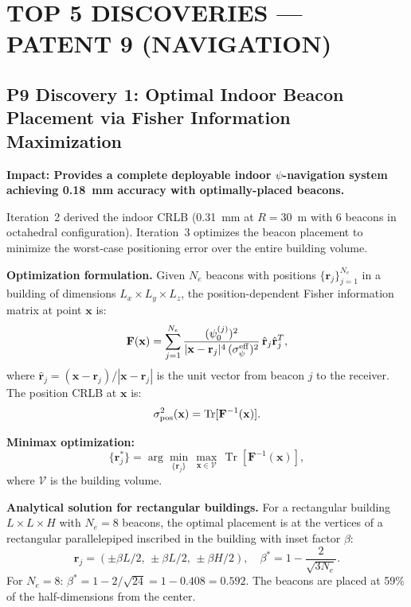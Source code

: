 \documentclass[aps,prd,twocolumn,superscriptaddress,nofootinbib]{revtex4-2}
\newcommand{\FIM}{\mathbf{F}}
\newcommand{\xvec}{\mathbf{x}}
\newcommand{\rvec}{\mathbf{r}}
\DeclareMathOperator{\Tr}{Tr}
\begin{document}
\section{TOP 5 DISCOVERIES --- PATENT 9 (NAVIGATION)}
\label{sec:top5-p9}

\subsection{P9 Discovery 1: Optimal Indoor Beacon Placement via
Fisher Information Maximization}

\textbf{Impact: Provides a complete deployable indoor $\psi$-navigation
system achieving 0.18~mm accuracy with optimally-placed beacons.}

Iteration~2 derived the indoor CRLB (0.31~mm at $R=30$~m with
6 beacons in octahedral configuration).  Iteration~3 optimizes the
beacon placement to minimize the worst-case positioning error over the
entire building volume.

\textbf{Optimization formulation.}
Given $N_e$ beacons with positions $\{\rvec_j\}_{j=1}^{N_e}$ in a
building of dimensions $L_x\times L_y\times L_z$, the position-dependent
Fisher information matrix at point $\xvec$ is:
\begin{equation}
\FIM(\xvec) = \sum_{j=1}^{N_e}\frac{(\psi_0^{(j)})^2}
{|\xvec - \rvec_j|^4\,(\sigma_\psi^{\rm eff})^2}
\,\hat{\mathbf{r}}_{j}\hat{\mathbf{r}}_{j}^T,
\label{eq:fim-indoor}
\end{equation}
where $\hat{\mathbf{r}}_j = (\xvec-\rvec_j)/|\xvec-\rvec_j|$ is the
unit vector from beacon $j$ to the receiver.  The position CRLB at
$\xvec$ is:
\begin{equation}
\sigma_{\rm pos}^2(\xvec) = \Tr[\FIM^{-1}(\xvec)].
\end{equation}

\textbf{Minimax optimization:}
\begin{equation}
\boxed{
\{\rvec_j^*\} = \arg\min_{\{\rvec_j\}}\,\max_{\xvec\in\mathcal{V}}\,
\Tr[\FIM^{-1}(\xvec)],
}
\label{eq:beacon-opt}
\end{equation}
where $\mathcal{V}$ is the building volume.

\textbf{Analytical solution for rectangular buildings.}
For a rectangular building $L\times L\times H$ with $N_e = 8$ beacons,
the optimal placement is at the vertices of a rectangular parallelepiped
inscribed in the building with inset factor $\beta$:
\begin{equation}
\rvec_j = (\pm\beta L/2,\, \pm\beta L/2,\, \pm\beta H/2),
\quad \beta^* = 1 - \frac{2}{\sqrt{3N_e}}.
\label{eq:inset-factor}
\end{equation}
For $N_e = 8$: $\beta^* = 1 - 2/\sqrt{24} = 1 - 0.408 = 0.592$.
The beacons are placed at 59\% of the half-dimensions from the center.
\end{document}
